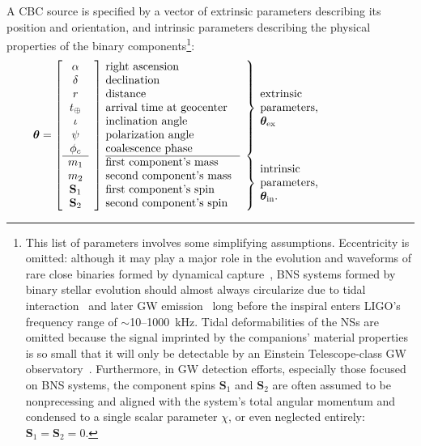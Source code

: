 \documentclass[amsmath,amssymb,aps,prx,reprint,nopreprintnumbers,nofootinbib]{revtex4-1}
\begin{document}
A \ac{CBC} source is specified by a vector of extrinsic parameters describing its position and orientation, and intrinsic parameters describing the physical properties of the binary components\footnote{This list of parameters involves some simplifying assumptions. Eccentricity is omitted: although it may play a major role in the evolution and waveforms of rare close binaries formed by dynamical capture~\citep{PhysRevD.87.043004,2013PhRvD..87l7501H,2014PhRvD..90h4016H}, \ac{BNS} systems formed by binary stellar evolution should almost always circularize due to tidal interaction~\citep{0004-637X-572-1-407} and later \ac{GW} emission~\citep{PhysRev.136.B1224} long before the inspiral enters LIGO's frequency range of $\sim$10\nobreakdashes--1000~kHz. Tidal deformabilities of the \acp{NS} are omitted because the signal imprinted by the companions' material properties is so small that it will only be detectable by an Einstein Telescope\nobreakdashes-class \ac{GW} observatory~\citep{PhysRevD.81.123016}. Furthermore, in \ac{GW} detection efforts, especially those focused on \ac{BNS} systems, the component spins $\mathbf{S}_1$ and $\mathbf{S}_2$ are often assumed to be nonprecessing and aligned with the system's total angular momentum and condensed to a single scalar parameter $\chi$, or even neglected entirely: $\mathbf{S}_1 = \mathbf{S}_2 = 0$.}:
%
\begin{equation}\label{eq:params}
    \bm\theta = \left[
    \begin{array}{cl@{\quad}p{4cm}lp{3.75cm}}
        \alpha & \rdelim]{11}{0mm} & right ascension & \rdelim\}{7}{1mm} & \multirow{7}{2cm}{extrinsic parameters, $\bm\theta_\mathrm{ex}$} \\
        \delta && declination & \\
        r && distance & \\
        t_\oplus && arrival time at geocenter & \\
        \iota && inclination angle & \\
        \psi && polarization angle & \\
        \phi_c && coalescence phase & \\
        \cline{1-1}\cline{3-3}
        m_1 && first component's mass & \rdelim\}{4}{1mm} & \multirow{4}{2cm}{intrinsic parameters, $\bm\theta_\mathrm{in}$.}\\
        m_2 && second component's mass & \\
        \mathbf S_1 && first component's spin & \\
        \mathbf S_2 && second component's spin & \\
    \end{array}\right.
\end{equation}
\end{document}

